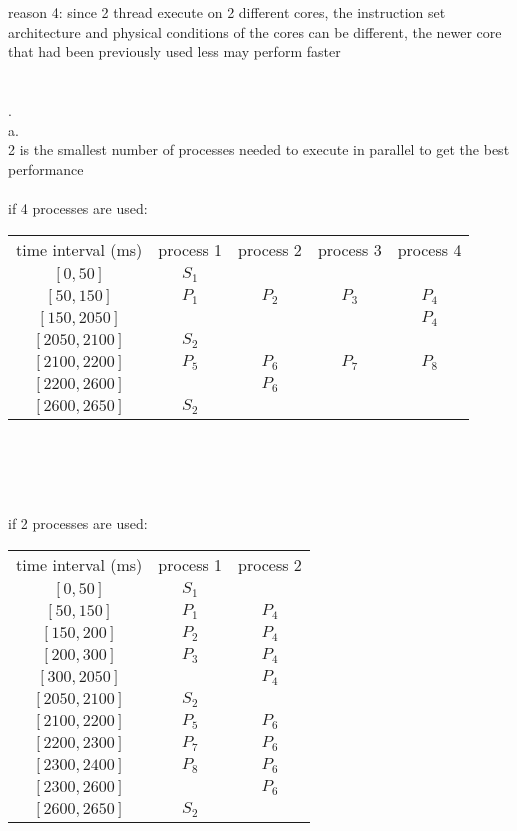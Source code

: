 \documentclass[12pt,border=4pt,multi]{article}%
\begin{document}
reason 4: since 2 thread execute on 2 different cores, the instruction set architecture and physical conditions of the cores can be different, the newer core that had been previously used less may perform faster\\
\\
\\
\newpage
{}.\\
a.\\
2 is the smallest number of processes needed to execute in parallel to get the best performance\\
\\
if 4 processes are used:
\begin{center}
\begin{tabular}{ccccc}
 time interval (ms) & process 1 & process 2 & process 3 & process 4\\
 $[0, 50]$ & $S_1$\\
 $[50, 150]$ & $P_1$ & $P_2$ & $P_3$ & $P_4$\\
 $[150, 2050]$ & & & & $P_4$\\
 $[2050, 2100]$ & $S_2$\\
 $[2100, 2200]$ & $P_5$ & $P_6$ & $P_7$ & $P_8$\\
 $[2200, 2600]$ & & $P_6$\\
 $[2600, 2650]$ & $S_2$\\
\end{tabular}
\end{center}
\leavevmode
\\
\\
\\
\\
if 2 processes are used:
\begin{center}
\begin{tabular}{ccc}
 time interval (ms) & process 1 & process 2\\
 $[0, 50]$ & $S_1$\\
 $[50, 150]$ & $P_1$ & $P_4$\\
 $[150, 200]$ & $P_2$ & $P_4$\\
 $[200, 300]$ & $P_3$ & $P_4$\\
 $[300, 2050]$ & & $P_4$\\
 $[2050, 2100]$ & $S_2$\\
 $[2100, 2200]$ & $P_5$ & $P_6$\\
 $[2200, 2300]$ & $P_7$ & $P_6$\\
 $[2300, 2400]$ & $P_8$ & $P_6$\\
 $[2300, 2600]$ & & $P_6$\\
 $[2600, 2650]$ & $S_2$\\
\end{tabular}
\end{center}
\end{document}
